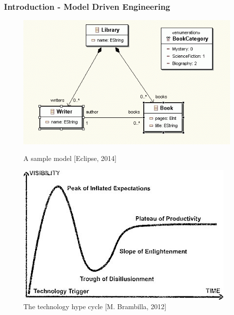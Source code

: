 
\begin{frame}
\frametitle{Introduction - Model Driven Engineering}

	\begin{figure}
		\begin{minipage}[b]{0.38\textwidth}
			\includegraphics[width=0.9\linewidth]{figures/sample_model.png}
		\caption{A sample model [Eclipse, 2014]}
		\label{uml_sample}
		\end{minipage}
	\begin{minipage}[b]{0.4\textwidth}
		\includegraphics[width=0.9\linewidth]{figures/mde_pos.jpg}
	\caption{The technology hype cycle [M. Brambilla, 2012]}
	\label{mde_pos}
	\end{minipage}
	\begin{minipage}{0.1\textwidth}
	\vspace{10mm}
	\end{minipage}
	\end{figure}
\end{frame}


